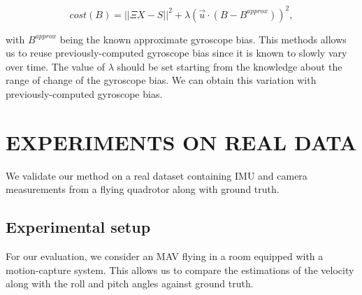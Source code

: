 \documentclass[letterpaper, 10 pt, conference]{ieeeconf}  %
\begin{document}
\[
cost(B) = ||\Xi X - S||^2 +  \lambda (\vec{u} \cdot (B - B^{approx} ))^2,
\]

\noindent with $B^{approx}$ being the known approximate gyroscope bias.
This methods allows us to reuse previously-computed gyroscope bias since it is known to slowly vary over time.
The value of $\lambda$ should be set starting from the knowledge about the range of change of the gyroscope bias.
We can obtain this variation with previously-computed gyroscope bias.

\section{EXPERIMENTS ON REAL DATA}\label{SectionPerformance}

We validate our method on a real dataset containing IMU and camera measurements from a flying quadrotor along with ground truth.

\subsection{Experimental setup}\label{SubsectionSetup}

For our evaluation, we consider an MAV flying in a room equipped with a motion-capture system.
This allows us to compare the estimations of the velocity along with the roll and pitch angles against ground truth.
\end{document}
